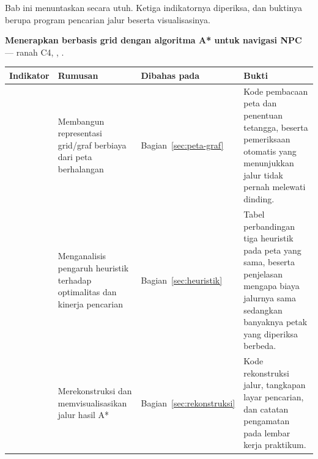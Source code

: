 \begin{subcpmkbox}
Bab ini menuntaskan  secara utuh. Ketiga indikatornya diperiksa,
dan buktinya berupa program pencarian jalur beserta visualisasinya.

\vspace{0.5em}
\textbf{ Menerapkan  berbasis grid dengan
algoritma A* untuk navigasi NPC} --- ranah C4, , .

\vspace{0.5em}
{\setlength{\tabcolsep}{4pt}\footnotesize%
\begin{tabularx}{\textwidth}{@{}C{1.9cm} L{4.0cm} L{2.5cm} Y@{}}
\toprule
\headrow \textbf{Indikator} & \textbf{Rumusan} & \textbf{Dibahas pada} & \textbf{Bukti} \\
\midrule
{} & Membangun representasi grid/graf berbiaya dari peta berhalangan &
Bagian~\ref{sec:peta-graf} &
Kode pembacaan peta dan penentuan tetangga, beserta pemeriksaan otomatis yang
menunjukkan jalur tidak pernah melewati dinding. \\
\addlinespace
{} & Menganalisis pengaruh heuristik terhadap optimalitas dan kinerja
pencarian &
Bagian~\ref{sec:heuristik} &
Tabel perbandingan tiga heuristik pada peta yang sama, beserta penjelasan
mengapa biaya jalurnya sama sedangkan banyaknya petak yang diperiksa
berbeda. \\
\addlinespace
{} & Merekonstruksi dan memvisualisasikan jalur hasil A* &
Bagian~\ref{sec:rekonstruksi} &
Kode rekonstruksi jalur, tangkapan layar pencarian, dan catatan pengamatan
pada lembar kerja praktikum. \\
\bottomrule
\end{tabularx}}
\end{subcpmkbox}
